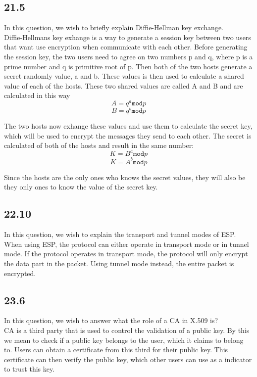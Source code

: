 \documentclass{article}
\begin{document}
\subsection{21.5}
In this question, we wish to briefly explain Diffie-Hellman key exchange.\\

Diffie-Hellmans key exhange is a way to generate a session key between two users that want use encryption when communicate with each other. Before generating the session key, the two users need to agree on two numbers p and q, where p is a prime number and q is primitive root of p. Then both of the two hosts generate a secret randomly value, a and b. These values is then used to calculate a shared value of each of the hosts. These two shared values are called A and B and are calculated in this way\\

\[A = q^a \texttt{mod} p\]
\[B = q^b \texttt{mod} p\]

The two hosts now exhange these values and use them to calculate the secret key, which will be used to encrypt the messages they send to each other. The secret is calculated of both of the hosts and result in the same number:
\[K = B^a \texttt{mod} p\]
\[K = A^b \texttt{mod} p\]

Since the hosts are the only ones who knows the secret values, they will also be they only ones to know the value of the secret key. 

\subsection{22.10} 
In this question, we wish to explain the transport and tunnel modes of ESP.\\

When using ESP, the protocol can either operate in transport mode or in tunnel mode. If the protocol operates in transport mode, the protocol will only encrypt the data part in the packet. Using tunnel mode instead, the entire packet is encrypted. 

\subsection{23.6}
In this question, we wish to answer what the role of a CA in X.509 is?\\

CA is a third party that is used to control the validation of a public key. By this we mean to check if a public key belongs to the user, which it claims to belong to. Users can obtain a certificate from this third for their public key. This certificate can then verify the public key, which other users can use as a indicator to trust this key. 
\end{document}
